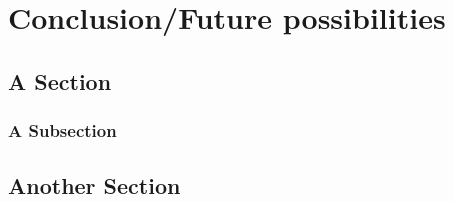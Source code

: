 \chapter{Conclusion/Future possibilities}


\section{A Section}


\subsection{A Subsection}


\section{Another Section}
